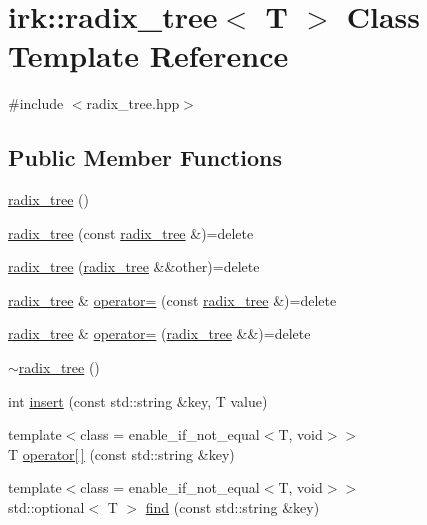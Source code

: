 \hypertarget{classirk_1_1radix__tree}{}\section{irk\+:\+:radix\+\_\+tree$<$ T $>$ Class Template Reference}
\label{classirk_1_1radix__tree}


{\ttfamily \#include $<$radix\+\_\+tree.\+hpp$>$}

\subsection*{Public Member Functions}
\begin{DoxyCompactItemize}
\item 
\mbox{\hyperlink{classirk_1_1radix__tree_a276f716ad240e75b4a3b2d1ee7c06663}{radix\+\_\+tree}} ()
\item 
\mbox{\hyperlink{classirk_1_1radix__tree_aaffbfdc0d841373868a7ca6672d0999f}{radix\+\_\+tree}} (const \mbox{\hyperlink{classirk_1_1radix__tree}{radix\+\_\+tree}} \&)=delete
\item 
\mbox{\hyperlink{classirk_1_1radix__tree_a83abd054182dee10a2a0f36c3974d420}{radix\+\_\+tree}} (\mbox{\hyperlink{classirk_1_1radix__tree}{radix\+\_\+tree}} \&\&other)=delete
\item 
\mbox{\hyperlink{classirk_1_1radix__tree}{radix\+\_\+tree}} \& \mbox{\hyperlink{classirk_1_1radix__tree_af052f00aa9f6f7ec58648365e28e30c8}{operator=}} (const \mbox{\hyperlink{classirk_1_1radix__tree}{radix\+\_\+tree}} \&)=delete
\item 
\mbox{\hyperlink{classirk_1_1radix__tree}{radix\+\_\+tree}} \& \mbox{\hyperlink{classirk_1_1radix__tree_a1b4f69f1e02478fe7b8a7dd590fef350}{operator=}} (\mbox{\hyperlink{classirk_1_1radix__tree}{radix\+\_\+tree}} \&\&)=delete
\item 
\mbox{\hyperlink{classirk_1_1radix__tree_a32491327f9b61b14c88f38ef6fd09a9f}{$\sim$radix\+\_\+tree}} ()
\item 
int \mbox{\hyperlink{classirk_1_1radix__tree_ad65f1ba2c32c59c3b6fd2ca220a9fc7f}{insert}} (const std\+::string \&key, T value)
\item 
{\footnotesize template$<$class  = enable\+\_\+if\+\_\+not\+\_\+equal$<$\+T, void$>$$>$ }\\T \mbox{\hyperlink{classirk_1_1radix__tree_af46c8d034084c54b33bb761ec96588d4}{operator\mbox{[}$\,$\mbox{]}}} (const std\+::string \&key)
\item 
{\footnotesize template$<$class  = enable\+\_\+if\+\_\+not\+\_\+equal$<$\+T, void$>$$>$ }\\std\+::optional$<$ T $>$ \mbox{\hyperlink{classirk_1_1radix__tree_a7a8f4484dd52244e712e204288e00b15}{find}} (const std\+::string \&key)

\end{DoxyCompactItemize}
